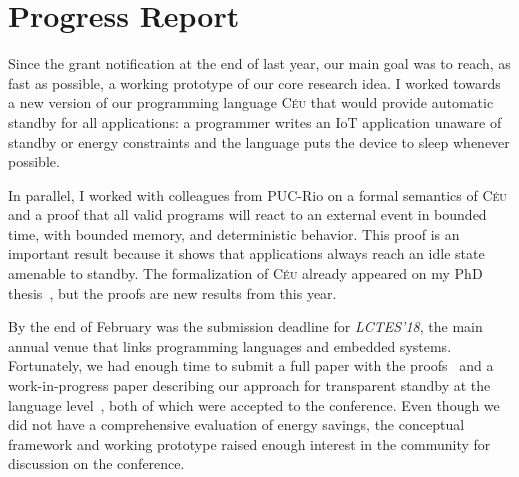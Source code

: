 \documentclass[12pt,english]{amsart}
\newcommand{\CEU}{\textsc{C\'{e}u}\xspace}
\begin{document}
\section{Progress Report}

Since the grant notification at the end of last year, our main goal was to
reach, as fast as possible, a working prototype of our core research idea.
%
I worked towards a new version of our programming language \CEU that would
provide automatic standby for all applications:
    a programmer writes an IoT application unaware of standby or energy
    constraints and the language puts the device to sleep whenever possible.

In parallel, I worked with colleagues from PUC-Rio on a formal semantics of
\CEU and a proof that all valid programs will react to an external event in
bounded time, with bounded memory, and deterministic behavior.
This proof is an important result because it shows that applications always
reach an idle state amenable to standby.
The formalization of \CEU already appeared on my PhD thesis~\cite{ceu.phd}, but
the proofs are new results from this year.

By the end of February was the submission deadline for \emph{LCTES'18}, the
main annual venue that links programming languages and embedded systems.
Fortunately, we had enough time to submit a full paper with the
proofs~\cite{ceu.lctes18} and a work-in-progress paper describing our approach
for transparent standby at the language level~\cite{ceu.lctes18.short}, both
of which were accepted to the conference.
%
Even though we did not have a comprehensive evaluation of energy savings, the
conceptual framework and working prototype raised enough interest in the
community for discussion on the conference.
\end{document}
